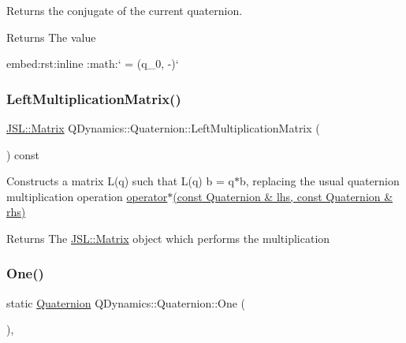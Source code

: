 Returns the conjugate of the current quaternion. 

\begin{DoxyReturn}{Returns}
The value\begin{DoxyVerb}embed:rst:inline :math:` = (q_0, -)` \end{DoxyVerb}
 
\end{DoxyReturn}
\mbox{\label{classQDynamics_1_1Quaternion_a2d0f1e0e8e46d1223f848da4f8b3fc2e}} 
\subsubsection{\texorpdfstring{Left\+Multiplication\+Matrix()}{LeftMultiplicationMatrix()}}
{\footnotesize\ttfamily \hyperlink{classJSL_1_1Matrix}{J\+S\+L\+::\+Matrix} Q\+Dynamics\+::\+Quaternion\+::\+Left\+Multiplication\+Matrix (\begin{DoxyParamCaption}{ }\end{DoxyParamCaption}) const\hspace{0.3cm}{\ttfamily [inline]}}



Constructs a matrix L(q) such that L(q) b = q$\ast$b, replacing the usual quaternion multiplication operation \hyperlink{namespaceQDynamics_ac40010112506831ced816640def9bc85}{operator$\ast$(const Quaternion \& lhs, const Quaternion \& rhs)} 

\begin{DoxyReturn}{Returns}
The \hyperlink{classJSL_1_1Matrix}{J\+S\+L\+::\+Matrix} object which performs the multiplication 
\end{DoxyReturn}
\mbox{\label{classQDynamics_1_1Quaternion_a06726eb02ffd68ccbd3adaef63c90bb9}} 
\subsubsection{\texorpdfstring{One()}{One()}}
{\footnotesize\ttfamily static \hyperlink{classQDynamics_1_1Quaternion}{Quaternion} Q\+Dynamics\+::\+Quaternion\+::\+One (\begin{DoxyParamCaption}{ }\end{DoxyParamCaption})\hspace{0.3cm}{\ttfamily [inline]}, {\ttfamily [static]}}



